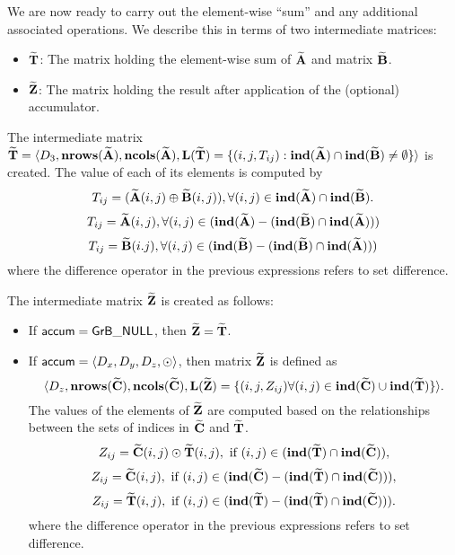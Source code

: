 We are now ready to carry out the element-wise ``sum'' and any additional 
associated operations.  We describe this in terms of two intermediate matrices:
\begin{itemize}
	\item ${\bf \widetilde{T}}$: The matrix holding the element-wise sum of
    ${\bf \widetilde{A}}$ and matrix ${\bf \widetilde{B}}$.
	\item ${\bf \widetilde{Z}}$: The matrix holding the result after 
    application of the (optional) accumulator.
\end{itemize}

The intermediate matrix ${\bf \widetilde{T}} = \langle
D_3, \bold{nrows}({\bf \widetilde{A}}), \bold{ncols}({\bf \widetilde{A}}),
\bold{L}({\bf \widetilde{T}}) =
\{(i,j,T_{ij}) : \bold{ind}({\bf \widetilde{A}}) \cap 
\bold{ind}({\bf \widetilde{B}})
 \neq \emptyset \} \rangle$
is created.  The value of each of its elements is computed by 
\[T_{ij} = ({\bf \widetilde{A}}(i,j) \oplus {\bf \widetilde{B}}(i,j)), \forall (i,j) \in \bold{ind}({\bf \widetilde{A}}) \cap \bold{ind}({\bf \widetilde{B}}).\]
\[T_{ij} = {\bf \widetilde{A}}(i,j), \forall (i,j) \in (\bold{ind}({\bf \widetilde{A}}) - (\bold{ind}({\bf \widetilde{B}}) \cap \bold{ind}({\bf \widetilde{A}})))\]
\[T_{ij} = {\bf \widetilde{B}}(i.j), \forall (i,j) \in (\bold{ind}({\bf \widetilde{B}}) - (\bold{ind}({\bf \widetilde{B}}) \cap \bold{ind}({\bf \widetilde{A}})))\]
where the difference operator in the previous expressions refers to set difference.


The intermediate matrix ${\bf \widetilde{Z}}$ is created as follows:
\begin{itemize}
    \item If ${\sf accum} = {\sf GrB\_NULL}$, then ${\bf \widetilde{Z}} = {\bf \widetilde{T}}$.

    \item If ${\sf accum} = \langle D_x, D_y, D_z, \odot \rangle$, then matrix ${\bf \widetilde{Z}}$ is defined as 
        \[ \langle D_z, \bold{nrows}({\bf \widetilde{C}}), \bold{ncols}({\bf \widetilde{C}}), \bold{L}({\bf \widetilde{Z}})
		= \{(i,j,Z_{ij})  \forall (i,j) \in \bold{ind}({\bf \widetilde{C}}) \cup 
        \bold{ind}({\bf \widetilde{T}}) \} \rangle.\]
    The values of the elements of ${\bf \widetilde{Z}}$ are computed based on the relationships between the sets of indices in ${\bf \widetilde{C}}$ and ${\bf \widetilde{T}}$.
\[
Z_{ij} = {\bf \widetilde{C}}(i,j) \odot {\bf \widetilde{T}}(i,j), \ \mbox{if}\  (i,j) \in  (\bold{ind}({\bf \widetilde{T}}) \cap \bold{ind}({\bf \widetilde{C}})),
\]
\[
Z_{ij} = \matrix{\widetilde{C}}(i,j), \ \mbox{if}\  (i,j) \in  (\bold{ind}(\matrix{\widetilde{C}}) - (\bold{ind}(\matrix{\widetilde{T}}) \cap \bold{ind}(\matrix{\widetilde{C}}))),
\]
\[
Z_{ij} = \matrix{\widetilde{T}}(i,j), \ \mbox{if}\  (i,j) \in  (\bold{ind}(\matrix{\widetilde{T}}) - (\bold{ind}(\matrix{\widetilde{T}}) \cap \bold{ind}(\matrix{\widetilde{C}}))).
\]
where the difference operator in the previous expressions refers to set difference.
\end{itemize}

